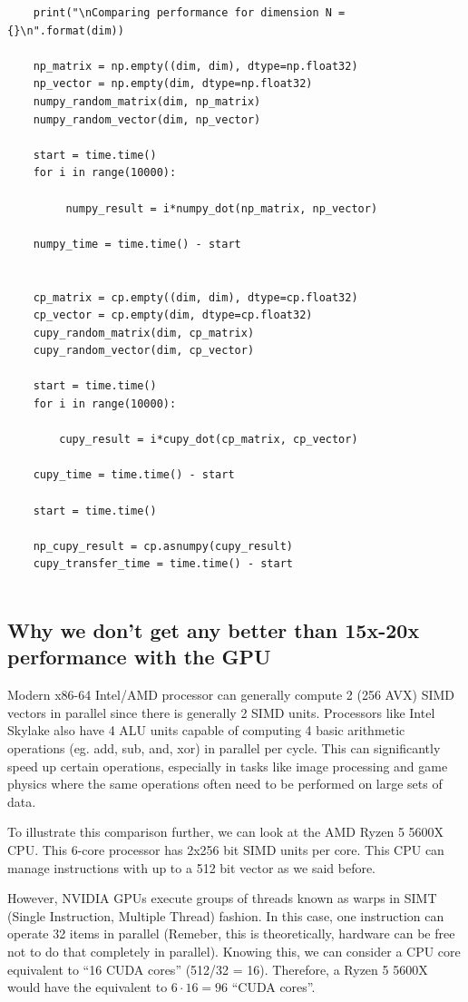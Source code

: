 \begin{lstlisting}
    print("\nComparing performance for dimension N = {}\n".format(dim))
    
    np_matrix = np.empty((dim, dim), dtype=np.float32)
    np_vector = np.empty(dim, dtype=np.float32)
    numpy_random_matrix(dim, np_matrix)
    numpy_random_vector(dim, np_vector)
    
    start = time.time()
    for i in range(10000):
    
         numpy_result = i*numpy_dot(np_matrix, np_vector)

    numpy_time = time.time() - start


    cp_matrix = cp.empty((dim, dim), dtype=cp.float32)
    cp_vector = cp.empty(dim, dtype=cp.float32)
    cupy_random_matrix(dim, cp_matrix)
    cupy_random_vector(dim, cp_vector)

    start = time.time()
    for i in range(10000):

        cupy_result = i*cupy_dot(cp_matrix, cp_vector)
   
    cupy_time = time.time() - start

    start = time.time()

    np_cupy_result = cp.asnumpy(cupy_result)
    cupy_transfer_time = time.time() - start
    
\end{lstlisting}

\subsection{Why we don't get any better than 15x-20x performance with the GPU}


Modern x86-64 Intel/AMD processor can generally compute 2 (256 AVX) SIMD vectors in parallel since there is generally 2 SIMD units. Processors like Intel Skylake also have 4 ALU units capable of computing 4 basic arithmetic operations (eg. add, sub, and, xor) in parallel per cycle. This can significantly speed up certain operations, especially in tasks like image processing and game physics where the same operations often need to be performed on large sets of data.


To illustrate this comparison further, we can look at the AMD Ryzen 5 5600X CPU. This 6-core processor has 2x256 bit SIMD units per core. This CPU can manage instructions with up to a 512 bit vector as we said before.

\clearpage

However, NVIDIA GPUs execute groups of threads known as warps in SIMT (Single Instruction, Multiple Thread) fashion. In this case, one instruction can operate 32 items in parallel (Remeber, this is theoretically, hardware can be free not to do that completely in parallel). Knowing this, we can consider a CPU core equivalent to ``16 CUDA cores'' (512/32 = 16). Therefore, a Ryzen 5 5600X would have the equivalent to $6 \cdot 16 = 96$ ``CUDA cores''.

